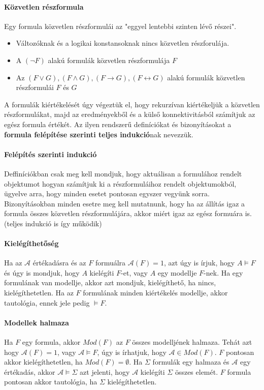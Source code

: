 \documentclass[10pt,a4paper]{article}
\begin{document}
\paragraph{Közvetlen részformula}
Egy formula közvetlen részformulái az "eggyel lentebbi szinten lévő részei". 
\begin{itemize}
\item Változóknak és a logikai konstansoknak nincs közvetlen részforulája.
\item A $(\neg F)$ alakú formulák közvetlen részformulája $F$
\item Az $(F \vee G), (F \wedge G), (F \rightarrow G), (F \leftrightarrow G)$ alakú formulák közvetlen részformulái  $F$ és $G$
\end{itemize}
A formulák kiértékelését úgy végeztük el, hogy rekurzívan kiértékeljük a közvetlen részformulákat, majd az eredményekből és a külső konnektivitásból számítjuk az egész formula értékét. Az ilyen rendszerű definíciókat és bizonyításokat a \textbf{formula felépítése szerinti teljes indukció}nak nevezzük.
\paragraph{Felépítés szerinti indukció}
Deffiníciókban csak meg kell mondjuk, hogy aktuálisan a formulához rendelt objektumot hogyan számítjuk ki a részformuláihoz rendelt objektumokból, ügyelve arra, hogy minden esetet pontosan egyszer vegyünk sorra. \newline
Bizonyításokban minden esetre meg kell mutatnunk, hogy ha az állítás igaz a formula összes közvetlen részformulájára, akkor miért igaz az egész formuára is. (teljes indukció is így működik)
\paragraph{Kielégíthetőség}
Ha az $\mathcal{A}$ értékadásra és az $F$ formuálra $\mathcal{A}(F)=1$, azt úgy is írjuk, hogy $A\models F$ és úgy is mondjuk, hogy $A$ kielégíti $F$-et, vagy $A$ egy modellje $F$-nek. Ha egy formulának van modellje, akkor azt mondjuk, kielégíthető, ha nincs, kielégíthetetlen. Ha az $F$ formulának minden kiértékelés modellje, akkor tautológia, ennek jele pedig $\models F$.
\paragraph{Modellek halmaza}
Ha $F$ egy formula, akkor $Mod(F)$ az $F$ összes modelljének halmaza. Tehát azt hogy $\mathcal{A}(F)=1$, vagy $\mathcal{A} \models F$, úgy is írhatjuk, hogy $\mathcal{A}\in Mod(F)$. $F$ pontosan akkor kielégíthetetlen, ha $Mod(F)=\emptyset$. Ha $\Sigma$ formulák egy halmaza és $\mathcal{A}$ egy értékadás, akkor $\mathcal{A} \models \Sigma$ azt jelenti, hogy $\mathcal{A}$ kielégíti $\Sigma$ összes elemét. $F$ formula pontosan akkor tautológia, ha $\Sigma$ kielégíthetetlen.
\end{document}
